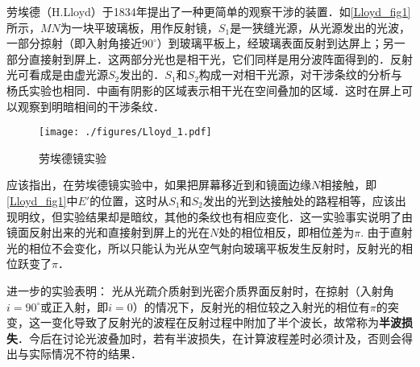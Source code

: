 
劳埃德（H.Lloyd）于1834年提出了一种更简单的观察干涉的装置．如\autoref{Lloyd_fig1}所示，$MN $为一块平玻璃板，用作反射镜，$S_1$是一狭缝光源，从光源发出的光波，一部分掠射（即入射角接近$90^\circ$）到玻璃平板上，经玻璃表面反射到达屏上；另一部分直接射到屏上．这两部分光也是相干光，它们同样是用分波阵面得到的．反射光可看成是由虚光源$S_2 $发出的．$S_1$和$S_2 $构成一对相干光源，对干涉条纹的分析与杨氏实验也相同．中画有阴影的区域表示相干光在空间叠加的区域．这时在屏上可以观察到明暗相间的干涉条纹．
\begin{figure}[ht]
\centering
\texttt{[image: ./figures/Lloyd\_1.pdf]}
\caption{劳埃德镜实验} \label{Lloyd_fig1}
\end{figure}
应该指出，在劳埃德镜实验中，如果把屏幕移近到和镜面边缘$N $相接触，即\autoref{Lloyd_fig1}中$E' $的位置，这时从$S_1$和$S_2$发出的光到达接触处的路程相等，应该出现明纹，但实验结果却是暗纹，其他的条纹也有相应变化．这一实验事实说明了由镜面反射出来的光和直接射到屏上的光在$N $处的相位相反，即相位差为$\pi$. 由于直射光的相位不会变化，所以只能认为光从空气射向玻璃平板发生反射时，反射光的相位跃变了$\pi$．

进一步的实验表明： 光从光疏介质射到光密介质界面反射时，在掠射（入射角$i=90^\circ$或正入射，即$i = 0$）的情况下，反射光的相位较之入射光的相位有$\pi$的突变，这一变化导致了反射光的波程在反射过程中附加了半个波长，故常称为\textbf{半波损失}．今后在讨论光波叠加时，若有半波损失，在计算波程差时必须计及，否则会得出与实际情况不符的结果．